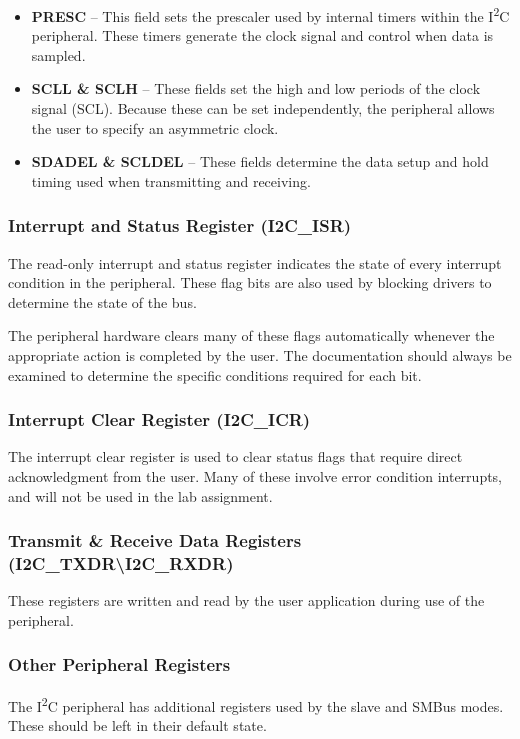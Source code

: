 \documentclass[openany,11pt,fleqn]{book} %
\begin{document}
    \begin{itemize}
        \item \textbf{PRESC} -- This field sets the prescaler used by internal timers within the I\textsuperscript{2}C peripheral. These timers generate the clock signal and control when data is sampled.  
        \item \textbf{SCLL \& SCLH} -- These fields set the high and low periods of the clock signal (SCL). Because these can be set independently, the peripheral allows the user to specify an asymmetric clock. 
        \item \textbf{SDADEL \& SCLDEL} -- These fields determine the data setup and hold timing used when transmitting and receiving. 
    \end{itemize}

    \subsubsection{Interrupt and Status Register (I2C\_ISR)}
    The read-only interrupt and status register indicates the state of every interrupt condition in the peripheral. These flag bits are also used by blocking drivers to determine the state of the bus.
    
    The peripheral hardware clears many of these flags automatically whenever the appropriate action is completed by the user. The documentation should always be examined to determine the specific conditions required for each bit. 
    \subsubsection{Interrupt Clear Register (I2C\_ICR)}
    The interrupt clear register is used to clear status flags that require direct acknowledgment from the user. Many of these involve error condition interrupts, and will not be used in the lab assignment.
    
    \subsubsection{Transmit \& Receive Data Registers (I2C\_TXDR{\textbackslash}I2C\_RXDR)}
    These registers are written and read by the user application during use of the peripheral. 
    
    \subsubsection{Other Peripheral Registers}
    The I\textsuperscript{2}C peripheral has additional registers used by the slave and SMBus modes. These should be left in their default state.
\end{document}

